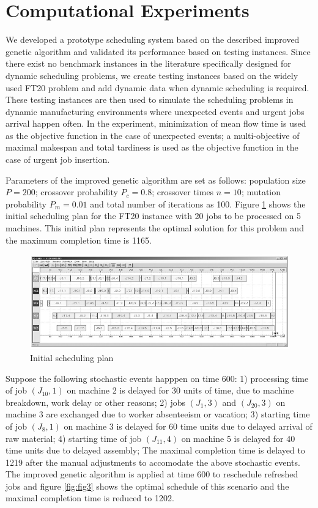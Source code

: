 \section{Computational Experiments}
We developed a prototype scheduling system based on the described improved genetic algorithm and validated its performance based on testing instances.
Since there exist no benchmark instances in the literature specifically designed for dynamic scheduling problems, we create testing instances based on the widely used FT20 problem and add dynamic data when dynamic scheduling is required.
These testing instances are then used to simulate the scheduling problems in dynamic manufacturing environments where unexpected events and urgent jobs arrival happen often.
In the experiment, minimization of mean flow time is used as the objective function in the case of unexpected events; a multi-objective of maximal makespan and total tardiness is used as the objective function in the case of urgent job insertion.

Parameters of the improved genetic algorithm are set as follows: population size $P = 200$; crossover probability $P_c = 0.8$; crossover times $n = 10$; mutation probability $P_m = 0.01$ and total number of iterations as 100.
Figure \ref{fig:fig2} shows the initial scheduling plan for the FT20 instance with 20 jobs to be processed on 5 machines.
This initial plan represents the optimal solution for this problem and the maximum completion time is 1165.

\begin{figure}[h!]
	\begin{center}
		\includegraphics[width=1\linewidth]{sections/figure2.jpg}
		\caption{Initial scheduling plan}
		\label{fig:fig2}
	\end{center}
\end{figure}


Suppose the following stochastic events happpen on time 600: 1) processing time of job $(J_{10}, 1)$ on machine 2 is delayed for 30 units of time, due to machine breakdown, work delay or other reasons; 2) jobs $(J_1, 3)$ and $(J_{20}, 3)$ on machine 3 are exchanged due to worker absenteeism or vacation; 3) starting time of job $(J_8, 1)$ on machine 3 is delayed for 60 time units due to delayed arrival of raw material; 4) starting time of job $(J_11, 4)$ on machine 5 is delayed for 40 time units due to delayed assembly;
The maximal completion time is delayed to 1219 after the manual adjustments to accomodate the above stochastic events.
The improved genetic algorithm is applied at time 600 to reschedule refreshed jobs and figure \ref{fig:fig3} shows the optimal schedule of this scenario and the maximal completion time is reduced to 1202.


